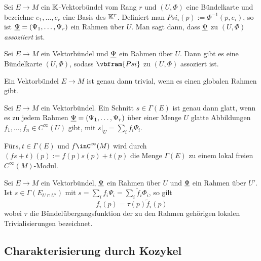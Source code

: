 \begin{proposition}
  Sei $E\to M$ ein $\mathbb{K}$-Vektorbündel vom Rang $r$ und $(U,\Phi)$ eine Bündelkarte und bezeichne $e_1,\dots, e_r$ eine
  Basis des $\mathbb{K}^r$. Definiert man $Psi_i(p) := \Phi^{-1}(p,e_i)$, so
  ist $\underline{\Psi} = (\Psi_1,\dots,\Psi_r)$ ein Rahmen über
  $U$. Man sagt dann, dass $\underline{\Psi}$ zu $(U,\Phi)$
  \emph{assoziiert} ist.
\end{proposition}

\begin{proposition}
  Sei $E\to M$ ein Vektorbündel und $\underline{\Psi}$ ein Rahmen über
  $U$. Dann gibt es eine Bündelkarte $(U,\Phi)$, sodass $\vbfram{Psi}$
  zu $(U,\Phi)$ assoziert ist.
\end{proposition}

\begin{proposition}
  Ein Vektorbündel $E\to M$ ist genau dann trivial, wenn es einen
  globalen Rahmen gibt.
\end{proposition}

\begin{proposition}
  Sei $E\to M$ ein Vektorbündel. Ein Schnitt $s\in \Gamma(E)$ ist
  genau dann glatt, wenn es zu jedem Rahmen $\underline{\Psi} =
  (\Psi_1,\dots,\Psi_r)$ über einer Menge $U$ glatte Abbildungen $f_1,\dots, f_n\in
  C^\infty(U)$ gibt, mit $s|_U = \sum_{i} f_i\Psi_i$.
\end{proposition}

\begin{proposition}
  Für$s,t\in\Gamma(E)$ und $f\inC^\infty(M)$ wird durch $(fs + t)(p)
  := f(p)s(p) + t(p)$ die Menge $\Gamma(E)$ zu einem lokal freien $C^\infty(M)$-Modul.
\end{proposition}

\begin{proposition}[TODO]
  Sei $E\to M$ ein Vektorbündel, $\underline{\Psi}$ ein Rahmen über $U$
  und $\underline{\Phi}$ ein Rahmen über $U'$. Ist $s\in\Gamma(E_{U\cap
    U'})$ mit $s = \sum_i f_i \Psi_i = \sum_i \tilde{f}_i \Phi_i$, so gilt
  \begin{equation*}
    f_i(p) = \tau(p)\tilde{f}_i(p)
  \end{equation*}
  wobei $\tau$ die Bündelübergangsfunktion der zu den Rahmen gehörigen
  lokalen Trivialisierungen bezeichnet.
\end{proposition}


\subsection*{Charakterisierung durch Kozykel}

